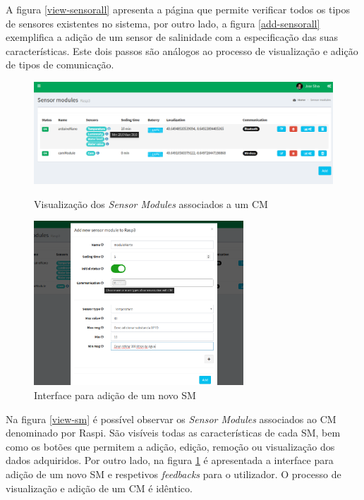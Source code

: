 A figura \ref{view-sensorall} apresenta a página que permite verificar todos os tipos de sensores existentes no sistema, por outro lado, a figura \ref{add-sensorall} exemplifica a adição de um sensor de salinidade com a especificação das suas características. Este dois passos são análogos ao processo de visualização e adição de tipos de comunicação.




\begin{figure}[h]
	\centering
	\begin{minipage}[b]{0.49\textwidth}
		\centering
		\includegraphics[width=\textwidth]{prints-web/sm_show.png}
		\caption{Visualização dos \textit{Sensor Modules} associados a um \acl{CM} }
		\label{view-sm}
	\end{minipage}
	\hfill
	\begin{minipage}[b]{0.49\textwidth}
		\centering
		\includegraphics[width=0.7\textwidth]{prints-web/sm_add.png}
		\caption{Interface para adição de um novo \acl{SM} }
		\label{add-sm}
	\end{minipage}
\end{figure}



Na figura \ref{view-sm} é possível observar os \textit{Sensor Modules} associados ao \acl{CM} denominado por Raspi. São visíveis todas as características de cada \acl{SM}, bem como os botões que permitem a adição, edição, remoção ou visualização dos dados adquiridos. Por outro lado, na figura \ref{add-sm} é apresentada a interface para adição de um novo \acl{SM} e respetivos \textit{feedbacks} para o utilizador. O processo de visualização e adição de um \acl{CM} é idêntico. 


